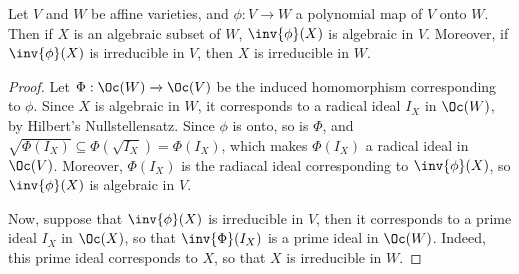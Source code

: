 \begin{proposition}\label{proposition_2.1.9}
  Let $V$ and  $W$ be affine varieties, and  $\phi:V \xrightarrow{} W$ a
  polynomial map of $V$ onto $W$. Then if $X$ is an algebraic subset of  $W$,
  $\inv{\phi}(X)$ is algebraic in $V$. Moreover, if  $\inv{\phi}(X)$ is
  irreducible in $V$, then  $X$ is irreducible in  $W$.
\end{proposition}
\begin{proof}
  Let $\Phi:\Oc(W) \xrightarrow{} \Oc(V)$ be the induced homomorphism
  corresponding to $\phi$. Since  $X$ is algebraic in  $W$, it corresponds to a
  radical ideal $I_X$ in $\Oc(W)$, by Hilbert's Nullstellensatz. Since $\phi$ is
  onto, so is $\Phi$, and $\sqrt{\Phi(I_X)} \subseteq
  \Phi(\sqrt{I_X})=\Phi(I_X)$, which makes $\Phi(I_X)$ a radical ideal in
  $\Oc(V)$. Moreover, $\Phi(I_X)$ is the radiacal ideal corresponding to
  $\inv{\phi}(X)$, so $\inv{\phi}(X)$ is algebraic in $V$.

  Now, suppose that $\inv{\phi}(X)$ is irreducible in $V$, then it corresponds
  to a prime ideal $I_X$ in $\Oc(X)$, so that $\inv{\Phi}(I_X)$ is a prime ideal
  in $\Oc(W)$. Indeed, this prime ideal corresponds to $X$, so that $X$ is
  irreducible in $W$.
\end{proof}

